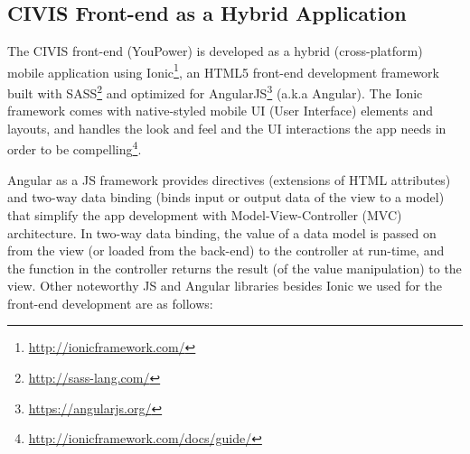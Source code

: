 \subsection{CIVIS Front-end as a Hybrid Application} 

The CIVIS front-end (YouPower) is developed as a hybrid (cross-platform) mobile application using Ionic\footnote{\url{http://ionicframework.com/}}, an HTML5 front-end development framework built with SASS\footnote{\url{http://sass-lang.com/}} and optimized for AngularJS\footnote{\url{https://angularjs.org/}} (a.k.a Angular). 
% 
The Ionic framework comes with native-styled mobile UI (User Interface) elements and layouts, and handles the look and feel and the UI interactions the app needs in order to be compelling\footnote{\url{http://ionicframework.com/docs/guide/}}. 

Angular as a JS framework provides directives (extensions of HTML attributes) and two-way data binding (binds input or output data of the view to a model) that simplify the app development with Model-View-Controller (MVC) architecture. 
In two-way data binding, the value of a data model is passed on from the view (or loaded from the back-end) to the controller at run-time, and the function in the controller returns the result (of the value manipulation) to the view. 
% 
Other noteworthy JS and Angular libraries besides Ionic we used for the front-end development are as follows:

